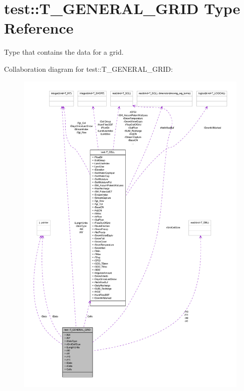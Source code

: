 \hypertarget{typetest_1_1_t___g_e_n_e_r_a_l___g_r_i_d}{
\section{test::T\_\-GENERAL\_\-GRID Type Reference}
\label{typetest_1_1_t___g_e_n_e_r_a_l___g_r_i_d}
}


Type that contains the data for a grid.  




Collaboration diagram for test::T\_\-GENERAL\_\-GRID:\nopagebreak
\begin{figure}[H]
\begin{center}
\leavevmode
\includegraphics[width=400pt]{typetest_1_1_t___g_e_n_e_r_a_l___g_r_i_d__coll__graph}
\end{center}
\end{figure}
